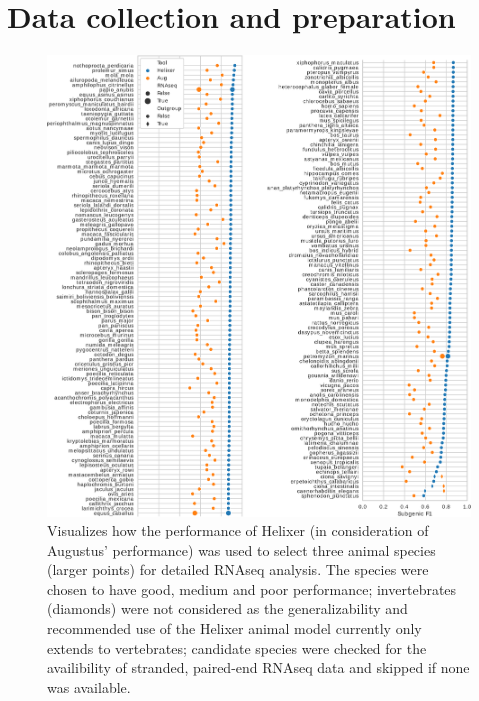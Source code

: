 \documentclass{article}
\begin{document}
\section{Data collection and preparation}
\label{ssec:data_prep}
\begin{figure}[!h]
\label{supfig:rna_select_animals}
\centerline{\includegraphics[width=1.0\textwidth]{images/RNAseq_animals_fit}}
\caption{Visualizes how the performance of Helixer (in consideration of Augustus' performance)
was used to select three animal species (larger points) for detailed RNAseq analysis. The 
species were chosen to have good, medium and poor performance; invertebrates (diamonds) were
not considered as the generalizability and recommended use of the Helixer animal model
currently only extends to vertebrates; candidate species were checked for the availibility of
stranded, paired-end RNAseq data and skipped if none was available.}
\end{figure}
\end{document}
